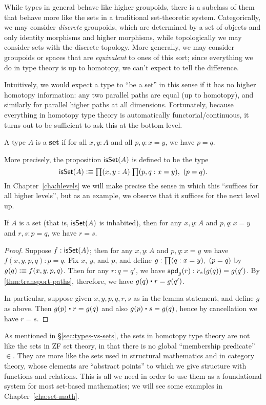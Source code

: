 While types in general behave like higher groupoids, there is a subclass of them that behave more like the sets in a traditional set-theoretic system.
Categorically, we may consider \emph{discrete} groupoids, which are determined by a set of objects and only identity morphisms and higher morphisms, while topologically we may consider sets with the discrete topology.
More generally, we may consider groupoids or spaces that are \emph{equivalent} to ones of this sort; since everything we do in type theory is up to homotopy, we can't expect to tell the difference.

Intuitively, we would expect a type to ``be a set'' in this sense if it has no higher homotopy information: any two parallel paths are equal (up to homotopy), and similarly for parallel higher paths at all dimensions.
Fortunately, because everything in homotopy type theory is automatically functorial/continuous, it turns out to be sufficient to ask this at the bottom level.

\begin{defn}\label{defn:set}
  A type $A$ is a \textbf{set} if for all $x,y:A$ and all $p,q:x=y$, we have $p=q$.
\end{defn}

More precisely, the proposition $\mathsf{isSet}(A)$ is defined to be the type
\[ \isset(A) \defeq \prd{x,y:A}{p,q:x=y} (p=q). \]
In Chapter~\ref{cha:hlevels} we will make precise the sense in which this ``suffices for all higher levels'', but as an example, we observe that it suffices for the next level up.

\begin{lem}\label{thm:isset-is1type}
  If $A$ is a set (that is, $\mathsf{isSet}(A)$ is inhabited), then for any $x,y:A$ and $p,q:x=y$ and $r,s:p=q$, we have $r=s$.
\end{lem}
\begin{proof}
  Suppose $f:\mathsf{isSet}(A)$; then for any $x,y:A$ and $p,q:x=y$ we have $f(x,y,p,q):p=q$.
  Fix $x$, $y$, and $p$, and define $g: \prd{q:x=y} (p=q)$ by $g(q) \vcentcolon\equiv f (x,y,p,q)$.
  Then for any $r:q=q'$, we have $\mathsf{apd}_{g}(r) : {r}_{*}\!\left({g(q)}\right) = g(q')$.
  By \autoref{thm:transport-paths}, therefore, we have $g(q) \ct r = g(q')$.

  In particular, suppose given $x,y,p,q,r,s$ as in the lemma statement, and define $g$ as above.
  Then $g(p) \ct r = g(q)$ and also $g(p) \ct s = g(q)$, hence by cancellation we have $r=s$.
\end{proof}

As mentioned in \S\ref{sec:types-vs-sets},
the sets in homotopy type theory are not like the sets in ZF set theory, in that there is no global ``membership predicate'' $\in$.
They are more like the sets used in structural mathematics and in category theory, whose elements are ``abstract points'' to which we give structure with functions and relations.
This is all we need in order to use them as a foundational system for most set-based mathematics; we will see some examples in Chapter~\ref{cha:set-math}.

